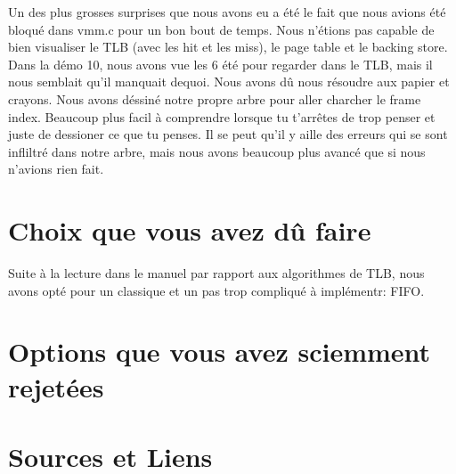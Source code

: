 \documentclass{article}
\begin{document}
    Un des plus grosses surprises que nous avons eu a été le fait que nous avions été bloqué dans vmm.c pour un bon bout de temps. Nous n'étions pas capable de bien visualiser le TLB (avec les hit et les miss), le page table et le backing store. Dans la démo 10, nous avons vue les 6 été pour regarder dans le TLB, mais il nous semblait qu'il manquait dequoi. Nous avons dû nous résoudre aux papier et crayons. Nous avons déssiné notre propre arbre pour aller charcher le frame index. Beaucoup plus facil à comprendre lorsque tu t'arrêtes de trop penser et juste de dessioner ce que tu penses. Il se peut qu'il y aille des erreurs qui se sont infliltré dans notre arbre, mais nous avons beaucoup plus avancé que si nous n'avions rien fait. \newline

    \section{Choix que vous avez dû faire}

    Suite à la lecture dans le manuel par rapport aux algorithmes de TLB, nous avons opté pour un classique et un pas trop compliqué à implémentr: FIFO. \newline

    \section{Options que vous avez sciemment rejetées}

    \section{Sources et Liens}
\end{document}
